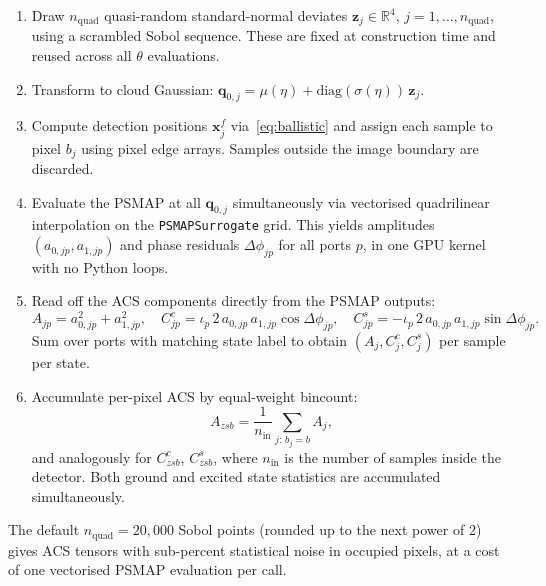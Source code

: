 \documentclass[11pt,a4paper]{article}
\newcommand{\q}{\mathbf{q}}
\newcommand{\x}{\mathbf{x}}
\newcommand{\R}{\mathbb{R}}
\begin{document}
\begin{enumerate}
  \item Draw $n_\mathrm{quad}$ quasi-random standard-normal deviates
        $\mathbf{z}_j \in \R^4$, $j=1,\ldots,n_\mathrm{quad}$, using a
        scrambled Sobol sequence.  These are fixed at construction time and
        reused across all $\theta$ evaluations.

  \item Transform to cloud Gaussian: $\q_{0,j} = \mu(\eta) + \mathrm{diag}(\sigma(\eta))\,\mathbf{z}_j$.

  \item Compute detection positions $\x^f_j$ via~\eqref{eq:ballistic} and
        assign each sample to pixel $b_j$ using pixel edge arrays.
        Samples outside the image boundary are discarded.

  \item Evaluate the PSMAP at all $\q_{0,j}$ simultaneously via vectorised
        quadrilinear interpolation on the \texttt{PSMAPSurrogate} grid.
        This yields amplitudes $(a_{0,jp}, a_{1,jp})$ and phase residuals
        $\Delta\phi_{jp}$ for all ports $p$, in one GPU kernel with no Python loops.

  \item Read off the ACS components directly from the PSMAP outputs:
        \begin{equation}
          A_{jp} = a_{0,jp}^2 + a_{1,jp}^2, \quad
          C^c_{jp} = \iota_p\,2\,a_{0,jp}\,a_{1,jp}\cos\Delta\phi_{jp}, \quad
          C^s_{jp} = -\iota_p\,2\,a_{0,jp}\,a_{1,jp}\sin\Delta\phi_{jp}.
        \end{equation}
        Sum over ports with matching state label to obtain
        $(A_j, C^c_j, C^s_j)$ per sample per state.

  \item Accumulate per-pixel ACS by equal-weight bincount:
        \begin{equation}
          A_{zsb} = \frac{1}{n_\mathrm{in}}
                    \sum_{j:\,b_j = b} A_{j},
        \end{equation}
        and analogously for $C^c_{zsb}$, $C^s_{zsb}$, where
        $n_\mathrm{in}$ is the number of samples inside the detector.
        Both ground and excited state statistics are accumulated simultaneously.
\end{enumerate}

The default $n_\mathrm{quad} = 20{,}000$ Sobol points (rounded up to the next
power of 2) gives ACS tensors with sub-percent statistical noise in occupied pixels,
at a cost of one vectorised PSMAP evaluation per call.
\end{document}
